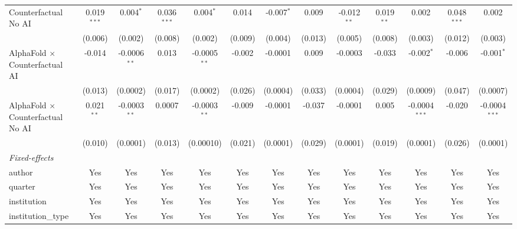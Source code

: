\begin{tabular}{lcccccccccccc}
   Counterfactual No AI                     & 0.019$^{***}$ & 0.004$^{*}$    & 0.036$^{***}$ & 0.004$^{*}$    & 0.014         & -0.007$^{*}$  & 0.009         & -0.012$^{**}$ & 0.019$^{**}$  & 0.002           & 0.048$^{***}$ & 0.002\\   
                                            & (0.006)       & (0.002)        & (0.008)       & (0.002)        & (0.009)       & (0.004)       & (0.013)       & (0.005)       & (0.008)       & (0.003)         & (0.012)       & (0.003)\\   
   AlphaFold $\times$ Counterfactual AI     & -0.014        & -0.0006$^{**}$ & 0.013         & -0.0005$^{**}$ & -0.002        & -0.0001       & 0.009         & -0.0003       & -0.033        & -0.002$^{*}$    & -0.006        & -0.001$^{*}$\\   
                                            & (0.013)       & (0.0002)       & (0.017)       & (0.0002)       & (0.026)       & (0.0004)      & (0.033)       & (0.0004)      & (0.029)       & (0.0009)        & (0.047)       & (0.0007)\\   
   AlphaFold $\times$ Counterfactual No AI  & 0.021$^{**}$  & -0.0003$^{**}$ & 0.0007        & -0.0003$^{**}$ & -0.009        & -0.0001       & -0.037        & -0.0001       & 0.005         & -0.0004$^{***}$ & -0.020        & -0.0004$^{***}$\\   
                                            & (0.010)       & (0.0001)       & (0.013)       & (0.00010)      & (0.021)       & (0.0001)      & (0.029)       & (0.0001)      & (0.019)       & (0.0001)        & (0.026)       & (0.0001)\\   
   \midrule
   \emph{Fixed-effects}\\
   author                                   & Yes           & Yes            & Yes           & Yes            & Yes           & Yes           & Yes           & Yes           & Yes           & Yes             & Yes           & Yes\\  
   quarter                                  & Yes           & Yes            & Yes           & Yes            & Yes           & Yes           & Yes           & Yes           & Yes           & Yes             & Yes           & Yes\\  
   institution                              & Yes           & Yes            & Yes           & Yes            & Yes           & Yes           & Yes           & Yes           & Yes           & Yes             & Yes           & Yes\\  
   institution\_type                        & Yes           & Yes            & Yes           & Yes            & Yes           & Yes           & Yes           & Yes           & Yes           & Yes             & Yes           & Yes\\  

\end{tabular}
